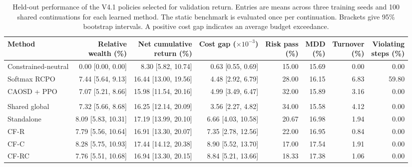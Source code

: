 \documentclass[10pt]{article}
\begin{document}
\begin{table}[tbp]
\centering
\caption{Held-out performance of the V4.1 policies selected for validation return. Entries are means across three training seeds and 100 shared continuations for each learned method. The static benchmark is evaluated once per continuation. Brackets give 95\% bootstrap intervals. A positive cost gap indicates an average budget exceedance.}
\label{tab:results}
\scriptsize
\setlength{\tabcolsep}{3pt}
\begin{tabularx}{\linewidth}{@{}Xrrrrrrr@{}}
\toprule
Method & \shortstack[r]{Relative\\wealth (\%)} & \shortstack[r]{Net cumulative\\return (\%)} &
\shortstack[r]{Cost gap\\($\times 10^{-3}$)} & \shortstack[r]{Risk pass\\(\%)} &
\shortstack[r]{MDD\\(\%)} & \shortstack[r]{Turnover\\(\%)} & \shortstack[r]{Violating\\steps (\%)} \\
\midrule
Constrained-neutral & 0.00 [0.00, 0.00] & 8.30 [5.82, 10.74] & 0.63 [0.55, 0.69] & 15.00 & 15.69 & 0.00 & 0.00 \\
Softmax RCPO        & 7.44 [5.64, 9.13] & 16.44 [13.00, 19.56] & 4.48 [2.92, 6.79] & 28.00 & 16.15 & 6.83 & 59.80 \\
CAOSD + PPO         & 7.07 [5.21, 8.66] & 15.98 [11.54, 20.16] & 4.99 [3.49, 6.47] & 32.00 & 15.89 & 3.16 & 0.00 \\
\addlinespace
\multicolumn{8}{@{}l}{CAOSD + RCPO} \\
\quad Shared global & 7.32 [5.66, 8.68] & 16.25 [12.14, 20.09] & 3.56 [2.27, 4.82] & 34.00 & 15.58 & 4.12 & 0.00 \\
\quad Standalone    & 8.09 [5.83, 10.31] & 17.19 [13.99, 20.10] & 6.66 [4.03, 10.58] & 20.67 & 16.98 & 1.94 & 0.00 \\
\quad CF-R          & 7.79 [5.56, 10.64] & 16.91 [13.30, 20.07] & 7.35 [2.78, 12.56] & 22.00 & 16.95 & 0.84 & 0.00 \\
\quad CF-C          & 8.28 [5.75, 10.93] & 17.44 [14.12, 20.38] & 8.90 [5.52, 13.70] & 17.00 & 17.54 & 1.91 & 0.00 \\
\quad CF-RC         & 7.76 [5.51, 10.68] & 16.94 [13.30, 20.15] & 8.84 [5.21, 13.66] & 18.33 & 17.38 & 1.06 & 0.00 \\
\bottomrule
\end{tabularx}
\end{table}
\end{document}
